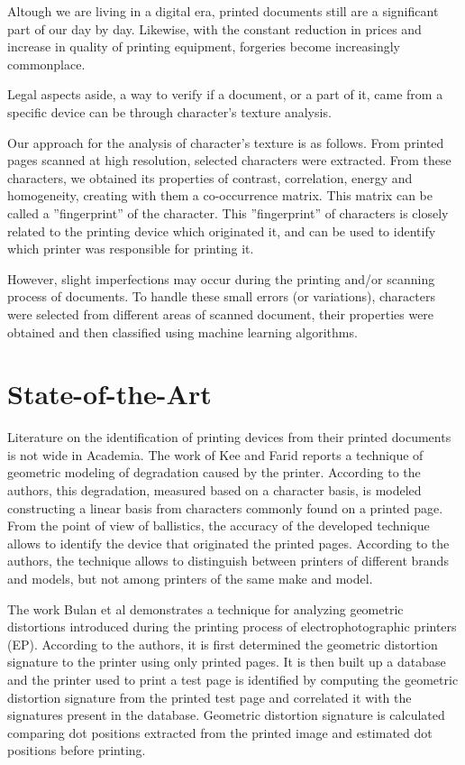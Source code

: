 \documentclass[10pt,twocolumn,letterpaper]{article}
\begin{document}
Altough we are living in a digital era, printed documents still are a significant part of our day by day. Likewise, with the constant reduction in prices and increase in quality of printing equipment, forgeries become increasingly commonplace.

Legal aspects aside, a way to verify if a document, or a part of it, came from a specific device can be through  character's texture analysis.

Our approach for the analysis of character's texture is as follows. From printed pages scanned at high resolution, selected characters were extracted. From these characters, we obtained its properties of contrast, correlation, energy and homogeneity, creating with them a co-occurrence matrix. This matrix can be called a ''fingerprint'' of the character. This ''fingerprint'' of  characters is closely related to the printing device which originated it, and can be used to identify which printer was responsible for printing it.

However, slight imperfections may occur during the printing and/or scanning process of documents. To handle these small errors (or variations), characters were selected from different areas of scanned document, their properties were obtained and then classified using machine learning algorithms.

\section{State-of-the-Art}
\label{sec:state_of_the_art}

Literature on the identification of printing devices from their printed documents is not wide in Academia. The work of Kee and Farid \cite{Printer_Profiling} reports a technique of geometric modeling of degradation caused by the printer. According to the authors, this degradation, measured based on a character basis, is modeled constructing a linear basis from characters commonly found on a printed page. From the point of view of ballistics, the accuracy of the developed technique allows to identify the device that originated the printed pages. According to the authors, the technique allows to distinguish between printers of different brands and models, but not among printers of the same make and model.

The work Bulan et al \cite{Bulan} demonstrates a technique for analyzing geometric distortions introduced during the printing process of electrophotographic printers (EP). According to the authors, it is first determined the geometric distortion signature to the printer using only printed pages. It is then built up a database and the printer used to print a test page is identified by computing the geometric distortion signature from the printed test page and correlated it with the signatures present in the database. Geometric distortion signature is calculated comparing dot positions extracted from the printed image and estimated dot positions before printing.
\end{document}
